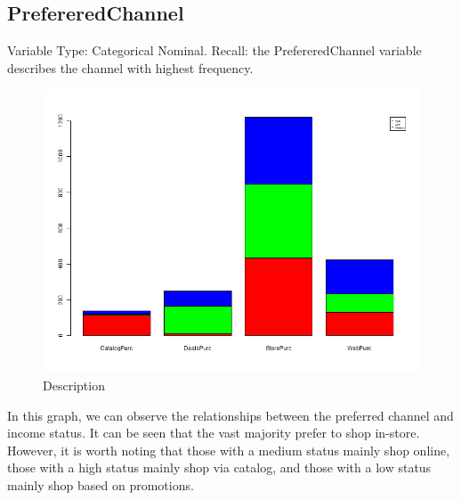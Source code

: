 \subsection{PrefereredChannel}
Variable Type: Categorical Nominal.\newline
Recall: the PrefereredChannel variable describes the channel with highest frequency.

\begin{figure}[H]
    \centering
    \includegraphics[width=0.8\linewidth]{Imatges/stacked_barplot_counts_IncomeSegment_10_legend(channel).png}
    \caption{Description }
    \label{fig:scree_plot}
\end{figure}
\newline
In this graph, we can observe the relationships between the preferred channel and income status. It can be seen that the vast majority prefer to shop in-store. However, it is worth noting that those with a medium status mainly shop online, those with a high status mainly shop via catalog, and those with a low status mainly shop based on promotions.


